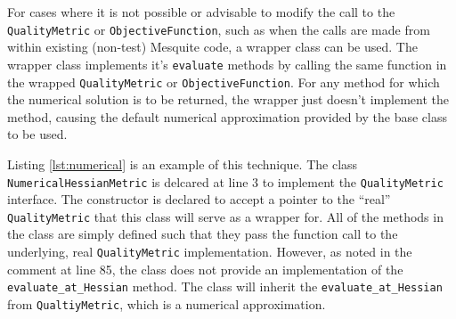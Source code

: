 \documentclass{article}
\begin{document}
For cases where it is not possible or advisable to modify the call to the \texttt{QualityMetric} or \texttt{ObjectiveFunction}, such as when the calls are made from within existing (non-test) Mesquite code, a wrapper class can be used.  The wrapper class implements it's \texttt{evaluate} methods by calling the same function in the wrapped \texttt{QualityMetric} or \texttt{ObjectiveFunction}.  For any method for which the numerical solution is to be returned, the wrapper just doesn't implement the method, causing the default numerical approximation provided by the base class to be used.

Listing \ref{lst:numerical} is an example of this technique.  The class \texttt{NumericalHessianMetric} is delcared at line 3 to implement the \texttt{QualityMetric} interface.  The constructor is declared to accept a pointer to the ``real'' \texttt{QualityMetric} that this class will serve as a wrapper for.  All of the methods in the class are simply defined such that they pass the function call to the underlying, real \texttt{QualityMetric} implementation.  However, as noted in the comment at line 85, the class does not provide an implementation of the \texttt{evaluate\_at\_Hessian} method.  The class will inherit the \texttt{evaluate\_at\_Hessian} from \texttt{QualtiyMetric}, which is a numerical approximation.
\end{document}
